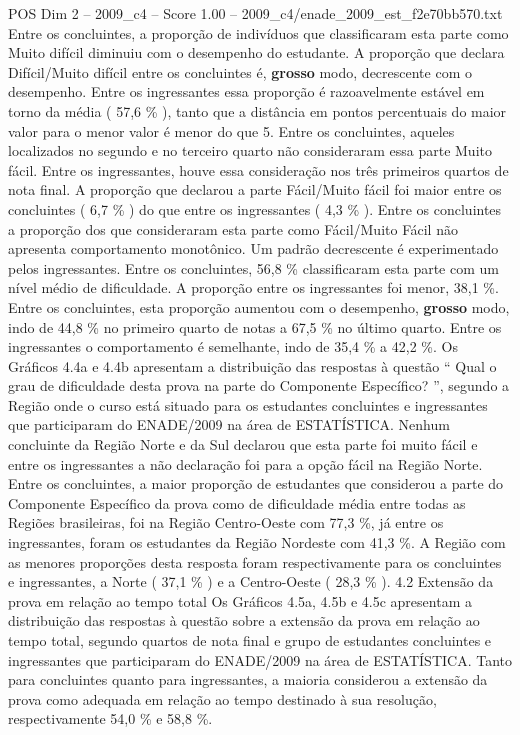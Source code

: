 \begin{textsample}{POS Dim 2 – 2009\_c4 – Score 1.00 – 2009\_c4/enade\_2009\_est\_f2e70bb570.txt}
Entre os concluintes, a proporção de indivíduos que classificaram esta parte como Muito difícil diminuiu com o desempenho do estudante.
A proporção que declara Difícil/Muito difícil entre os concluintes é, \textbf{grosso} modo, decrescente com o desempenho.
Entre os ingressantes essa proporção é razoavelmente estável em torno da média ( 57,6 \% ), tanto que a distância em pontos percentuais do maior valor para o menor valor é menor do que 5.
Entre os concluintes, aqueles localizados no segundo e no terceiro quarto não consideraram essa parte Muito fácil.
Entre os ingressantes, houve essa consideração nos três primeiros quartos de nota final.
A proporção que declarou a parte Fácil/Muito fácil foi maior entre os concluintes ( 6,7 \% ) do que entre os ingressantes ( 4,3 \% ).
Entre os concluintes a proporção dos que consideraram esta parte como Fácil/Muito Fácil não apresenta comportamento monotônico.
Um padrão decrescente é experimentado pelos ingressantes.
Entre os concluintes, 56,8 \% classificaram esta parte com um nível médio de dificuldade.
A proporção entre os ingressantes foi menor, 38,1 \%.
Entre os concluintes, esta proporção aumentou com o desempenho, \textbf{grosso} modo, indo de 44,8 \% no primeiro quarto de notas a 67,5 \% no último quarto.
Entre os ingressantes o comportamento é semelhante, indo de 35,4 \% a 42,2 \%.
Os Gráficos 4.4a e 4.4b apresentam a distribuição das respostas à questão “ Qual o grau de dificuldade desta prova na parte do Componente Específico? ”, segundo a Região onde o curso está situado para os estudantes concluintes e ingressantes que participaram do ENADE/2009 na área de ESTATÍSTICA.
Nenhum concluinte da Região Norte e da Sul declarou que esta parte foi muito fácil e entre os ingressantes a não declaração foi para a opção fácil na Região Norte.
Entre os concluintes, a maior proporção de estudantes que considerou a parte do Componente Específico da prova como de dificuldade média entre todas as Regiões brasileiras, foi na Região Centro-Oeste com 77,3 \%, já entre os ingressantes, foram os estudantes da Região Nordeste com 41,3 \%.
A Região com as menores proporções desta resposta foram respectivamente para os concluintes e ingressantes, a Norte ( 37,1 \% ) e a Centro-Oeste ( 28,3 \% ). 4.2 Extensão da prova em relação ao tempo total Os Gráficos 4.5a, 4.5b e 4.5c apresentam a distribuição das respostas à questão sobre a extensão da prova em relação ao tempo total, segundo quartos de nota final e grupo de estudantes concluintes e ingressantes que participaram do ENADE/2009 na área de ESTATÍSTICA.
Tanto para concluintes quanto para ingressantes, a maioria considerou a extensão da prova como adequada em relação ao tempo destinado à sua resolução, respectivamente 54,0 \% e 58,8 \%.

\end{textsample}
